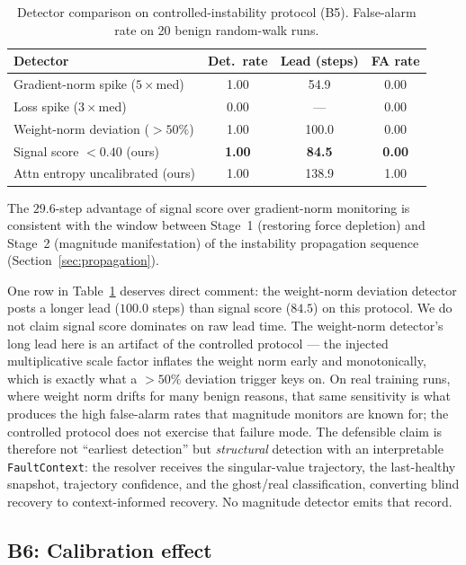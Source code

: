 \documentclass[11pt,a4paper]{article}
\theoremstyle{plain}
\begin{document}
\begin{table}[h]
\centering
\caption{Detector comparison on controlled-instability protocol (B5).
  False-alarm rate on 20 benign random-walk runs.}
\label{tab:b5}
\begin{tabular}{lccc}
\toprule
Detector & Det.\ rate & Lead (steps) & FA rate \\
\midrule
Gradient-norm spike ($5{\times}$med)   & 1.00 & 54.9  & 0.00 \\
Loss spike ($3{\times}$med)            & 0.00 & ---   & 0.00 \\
Weight-norm deviation ($>50\%$)        & 1.00 & 100.0 & 0.00 \\
Signal score $< 0.40$ (ours)           & \textbf{1.00} & \textbf{84.5} & \textbf{0.00} \\
Attn entropy uncalibrated (ours)       & 1.00 & 138.9 & 1.00 \\
\bottomrule
\end{tabular}
\end{table}

The $29.6$-step advantage of signal score over gradient-norm monitoring
is consistent with the window between Stage~1 (restoring force depletion)
and Stage~2 (magnitude manifestation) of the instability propagation
sequence (Section~\ref{sec:propagation}).

One row in Table~\ref{tab:b5} deserves direct comment: the weight-norm
deviation detector posts a longer lead ($100.0$ steps) than signal score
($84.5$) on this protocol. We do not claim signal score dominates on
raw lead time. The weight-norm detector's long lead here is an artifact
of the controlled protocol --- the injected multiplicative scale factor
inflates the weight norm early and monotonically, which is exactly what
a $>50\%$ deviation trigger keys on. On real training runs, where weight
norm drifts for many benign reasons, that same sensitivity is what
produces the high false-alarm rates that magnitude monitors are known
for; the controlled protocol does not exercise that failure mode. The
defensible claim is therefore not ``earliest detection'' but
\emph{structural} detection with an interpretable
\texttt{FaultContext}: the resolver receives the singular-value
trajectory, the last-healthy snapshot, trajectory confidence, and the
ghost/real classification, converting blind recovery to context-informed
recovery. No magnitude detector emits that record.

\subsection{B6: Calibration effect}
\label{sec:b6}
\end{document}
